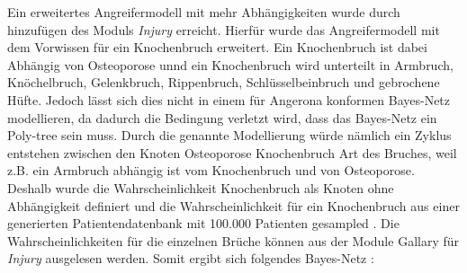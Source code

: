 \documentclass[german,version-2020-11]{uzl-thesis}
\begin{document}
Ein erweitertes Angreifermodell mit mehr Abhängigkeiten wurde durch hinzufügen des Moduls \textit{Injury} erreicht. Hierfür wurde das Angreifermodell mit dem Vorwissen für ein Knochenbruch erweitert. Ein Knochenbruch ist dabei Abhängig von Osteoporose unnd ein Knochenbruch wird unterteilt in Armbruch, Knöchelbruch, Gelenkbruch, Rippenbruch, Schlüsselbeinbruch und gebrochene Hüfte. Jedoch lässt sich dies nicht in einem für Angerona konformen Bayes-Netz modellieren, da dadurch die Bedingung verletzt wird, dass das Bayes-Netz ein Poly-tree sein muss. Durch die genannte Modellierung würde nämlich ein Zyklus entstehen zwischen den Knoten Osteoporose \leftrightarrow Knochenbruch \leftrightarrow Art des Bruches, weil z.B. ein Armbruch abhängig ist vom Knochenbruch und von Osteoporose. \\ 
Deshalb wurde die Wahrscheinlichkeit Knochenbruch als Knoten ohne Abhängigkeit definiert und die Wahrscheinlichkeit für ein Knochenbruch aus einer generierten Patientendatenbank mit 100.000 Patienten gesampled . Die Wahrscheinlichkeiten für die einzelnen Brüche können aus der Module Gallary für \textit{Injury} ausgelesen werden. Somit ergibt sich folgendes Bayes-Netz :
\end{document}

